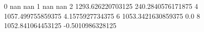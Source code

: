 0 nan nan
1 nan nan
2 1293.626220703125 240.2840576171875
4 1057.499755859375 4.1575927734375
6 1053.3421630859375 0.0
8 1052.841064453125 -0.5010986328125
